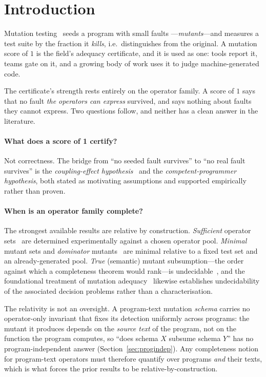\documentclass[runningheads,envcountsect,envcountsame]{llncs}
\begin{document}
\section{Introduction}
\label{sec:intro}

Mutation testing~\cite{demillo1978,hamlet1977} seeds a program with small faults
---\emph{mutants}---and measures a test suite by the fraction it \emph{kills},
i.e.\ distinguishes from the original. A mutation score of $1$ is the field's
adequacy certificate, and it is used as one: tools report it, teams gate on it,
and a growing body of work uses it to judge machine-generated code.

The certificate's strength rests entirely on the operator family. A score of $1$
says that no fault \emph{the operators can express} survived, and says nothing
about faults they cannot express. Two questions follow, and neither has a clean
answer in the literature.

\paragraph{What does a score of 1 certify?}
Not correctness. The bridge from ``no seeded fault survives'' to ``no real fault
survives'' is the \emph{coupling-effect hypothesis}~\cite{demillo1978} and the
\emph{competent-programmer hypothesis}, both stated as motivating assumptions and
supported empirically~\cite{offutt1992,jia2011,just2014} rather than proven.

\paragraph{When is an operator family complete?}
The strongest available results are relative by construction. \emph{Sufficient}
operator sets~\cite{offutt1996} are determined experimentally against a chosen
operator pool. \emph{Minimal} mutant sets and \emph{dominator}
mutants~\cite{ammann2014} are minimal relative to a fixed test set and an
already-generated pool. \emph{True} (semantic) mutant subsumption---the order
against which a completeness theorem would rank---is undecidable~\cite{kurtz2015},
and the foundational treatment of mutation adequacy~\cite{budd1982} likewise
establishes undecidability of the associated decision problems rather than a
characterisation.

The relativity is not an oversight. A program-text mutation \emph{schema} carries
no operator-only invariant that fixes its detection uniformly across programs:
the mutant it produces depends on the \emph{source text} of the program, not on
the function the program computes, so ``does schema $X$ subsume schema $Y$'' has
no program-independent answer (Section~\ref{sec:progindep}). Any completeness
notion for program-text operators must therefore quantify over programs
\emph{and} their texts, which is what forces the prior results to be
relative-by-construction.
\end{document}
